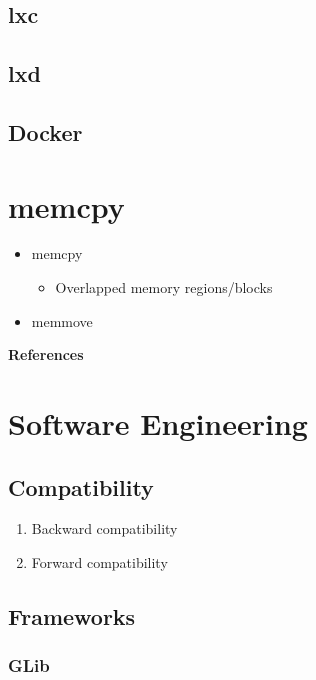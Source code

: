 \documentclass[12pt,a4paper]{article}
\begin{document}
\subsection{lxc}

\subsection{lxd}

\subsection{Docker}

\section{memcpy}

\begin{itemize}
\item memcpy

	\begin{itemize}
	\item Overlapped memory regions/blocks
	\end{itemize}

\item memmove
\end{itemize}

\textbf{References}

\section{Software Engineering}

\subsection{Compatibility}

\begin{enumerate}
\item Backward compatibility
\item Forward compatibility
\end{enumerate}

\subsection{Frameworks}

\subsubsection{GLib}
\end{document}
